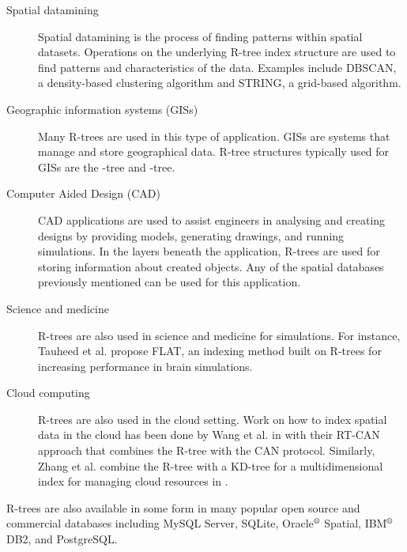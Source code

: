 \begin{description}
	\item[Spatial datamining] Spatial datamining is the process of finding
	patterns within spatial datasets. Operations on the underlying R-tree 
	index structure are used to find patterns and characteristics of the 
	data. Examples include DBSCAN\cite{ester1996density}, a density-based 
	clustering algorithm and STRING\cite{wang1997sting}, a grid-based 
	algorithm. 
	\item[Geographic information systems (GISs)] Many R-trees are used in 
	this type of application. GISs are systems that manage and store 
	geographical data. R-tree structures typically used for GISs are the 
	\rbase-tree\cite{guttman84} and \rstar-tree\cite{beckmannkriegelschneiderseeger90}.
	\item[Computer Aided Design (CAD)] CAD applications are used to assist
	engineers in analysing and creating designs by providing models, 
	generating drawings, and running simulations. In the layers beneath the
	application, R-trees are used for storing information about created 
	objects. Any of the spatial databases previously mentioned can be used 
	for this application. 
	\item[Science and medicine] R-trees are also used in science and 
	medicine for simulations. For instance, Tauheed et al. propose FLAT, an 
	indexing method built on R-trees for increasing performance in brain 
	simulations\cite{tauheed2012accelerating}.
	\item[Cloud computing] R-trees are also used in the cloud setting. Work
	on how to index spatial data in the cloud has been done by Wang et al. in
	 \cite{wang2009retrieving} with their RT-CAN approach that combines the 
	R-tree with the CAN protocol. Similarly, Zhang et al. combine the R-tree
	with a KD-tree for a multidimensional index for managing cloud resources 
	in \cite{zhang2009efficient}.
\end{description}

R-trees are also available in some form in many popular open source and 
commercial databases including MySQL Server, SQLite, Oracle$\textsuperscript{\textregistered}$ Spatial, IBM$\textsuperscript{\textregistered}$ DB2, and 
PostgreSQL. 


